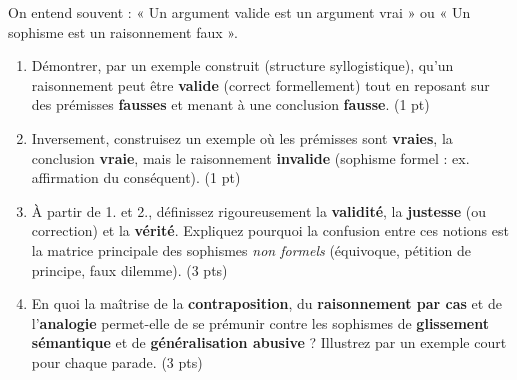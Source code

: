 \documentclass[11pt]{article}
\begin{document}
\begin{exercice}
On entend souvent : « Un argument valide est un argument vrai » ou « Un sophisme est un raisonnement faux ».
\begin{enumerate}
    \item Démontrer, par un exemple construit (structure syllogistique), qu'un raisonnement peut être \textbf{valide} (correct formellement) tout en reposant sur des prémisses \textbf{fausses} et menant à une conclusion \textbf{fausse}. (1 pt)
    \item Inversement, construisez un exemple où les prémisses sont \textbf{vraies}, la conclusion \textbf{vraie}, mais le raisonnement \textbf{invalide} (sophisme formel : ex. affirmation du conséquent). (1 pt)
    \item À partir de 1. et 2., définissez rigoureusement la \textbf{validité}, la \textbf{justesse} (ou correction) et la \textbf{vérité}. Expliquez pourquoi la confusion entre ces notions est la matrice principale des sophismes \textit{non formels} (équivoque, pétition de principe, faux dilemme). (3 pts)
    \item En quoi la maîtrise de la \textbf{contraposition}, du \textbf{raisonnement par cas} et de l'\textbf{analogie} permet-elle de se prémunir contre les sophismes de \textbf{glissement sémantique} et de \textbf{généralisation abusive} ? Illustrez par un exemple court pour chaque parade. (3 pts)
\end{enumerate}
\end{exercice}
\end{document}
